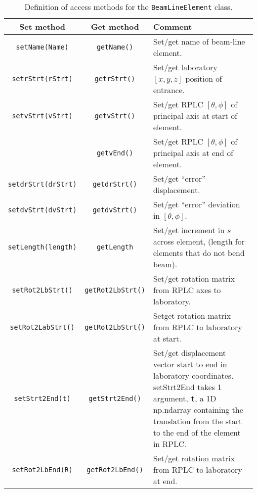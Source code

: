 \begin{sidewaystable}[h]
  \caption{
    Definition of access methods for the \texttt{BeamLineElement}
    class. 
  }
  \label{Tab:BLE:Methods}
  \begin{center}
    \begin{tabular}{|c|c|p{10cm}|}
      \hline
      \textbf{Set method} & \textbf{Get method}  & \textbf{Comment}                                                         \\
      \hline
      \texttt{setName(Name)}     & \texttt{getName()}        & Set/get name of beam-line element.                                \\
      \texttt{setrStrt(rStrt)}   & \texttt{getrStrt()}       & Set/get laboratory $[x, y, z]$ position of entrance.              \\
      \texttt{setvStrt(vStrt)}   & \texttt{getvStrt()}       & Set/get RPLC $[\theta, \phi]$ of principal axis at start of element. \\
                                 & \texttt{getvEnd()}        & Set/get RPLC $[\theta, \phi]$ of principal axis at end of element.   \\
      \texttt{setdrStrt(drStrt)} & \texttt{getdrStrt()}      & Set/get ``error'' displacement.                                   \\
      \texttt{setdvStrt(dvStrt)} & \texttt{getdvStrt()}      & Set/get ``error'' deviation in $[\theta, \phi]$.                  \\
      \texttt{setLength(length)} & \texttt{getLength}        & Set/get increment in $s$ across element, (length for elements that do not bend beam). \\
      \texttt{setRot2LbStrt()}   & \texttt{getRot2LbStrt()}  & Set/get rotation matrix from RPLC axes to laboratory.             \\
      \texttt{setRot2LabStrt()}  & \texttt{getRot2LbStrt()}  & Setget rotation matrix from RPLC to laboratory at start.             \\
      \texttt{setStrt2End(t)}    & \texttt{getStrt2End()}    & Set/get displacement vector start to end in laboratory coordinates.
                                                               setStrt2End takes 1 argument, \texttt{t}, a 1D np.ndarray containing
                                                               the translation from the start to the end of the element in RPLC. \\
      \texttt{setRot2LbEnd(R)}  & \texttt{getRot2LbEnd()}    & Set/get rotation matrix from RPLC to laboratory at end.

\end{tabular}
\end{center}
\end{sidewaystable}
